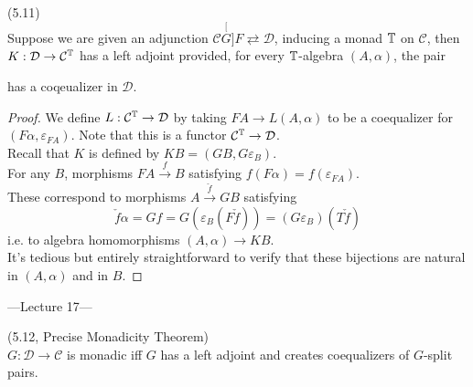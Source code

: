 \documentclass[a4paper]{article}
\begin{document}
\begin{lemma} (5.11)\\
    Suppose we are given an adjunction $\mathcal{C} \stackrel[G]{F}{\rightleftarrows} \mathcal{D}$, inducing a monad $\mathbb{T}$ on $\mathcal{C}$, then $K:\mathcal{D} \to \mathcal{C}^{\mathbb{T}}$ has a left adjoint provided, for every $\mathbb{T}$-algebra $(A,\alpha)$, the pair 
    has a coqeualizer in $\mathcal{D}$.
    \begin{proof}
        We define $L:\mathcal{C}^{\mathbb{T}} \to \mathcal{D}$ by taking $FA \to L(A,\alpha)$ to be a coequalizer for $(F\alpha,\varepsilon_{FA})$. Note that this is a functor $\mathcal{C}^{\mathbb{T}} \to \mathcal{D}$.\\
        Recall that $K$ is defined by $KB=(GB,G\varepsilon_B)$.\\
        For any $B$, morphisms $FA \xrightarrow{f} B$ satisfying $f(F\alpha) = f(\varepsilon_{FA})$.\\
        These correspond to morphisms $A \xrightarrow{\check{f}} GB$ satisfying 
        $$\check{f}\alpha = Gf = G(\varepsilon_B (F\check{f})) = (G\varepsilon_B) (T\check{f})$$
        i.e. to algebra homomorphisms $(A,\alpha) \to KB$.\\
        It's tedious but entirely straightforward to verify that these bijections are natural in $(A,\alpha)$ and in $B$.
    \end{proof}
\end{lemma}

---Lecture 17---

\begin{thm} (5.12, Precise Monadicity Theorem)\\
    $G:\mathcal{D} \to \mathcal{C}$ is monadic iff $G$ has a left adjoint and creates coequalizers of $G$-split pairs.
\end{thm}
\end{document}
